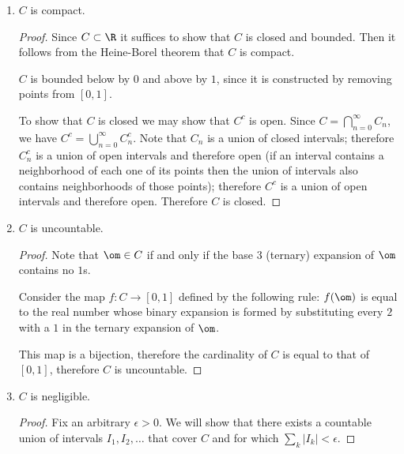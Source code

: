 \begin{enumerate}[label=(2.\arabic*)]
\item
  \begin{claim*}
    $C$ is compact.
  \end{claim*}
  \begin{proof} 
    Since $C \subset \R$ it suffices to show that $C$ is closed and bounded. Then it follows from the Heine-Borel
    theorem that $C$ is compact.

    $C$ is bounded below by $0$ and above by $1$, since it is constructed by removing points from $[0, 1]$.

    To show that $C$ is closed we may show that $C^c$ is open. Since $C = \bigcap_{n=0}^\infty C_n$, we
    have $C^c = \bigcup_{n=0}^\infty C_n^c$. Note that $C_n$ is a union of closed intervals; therefore $C_n^c$
    is a union of open intervals and therefore open (if an interval contains a neighborhood of each one of its
    points then the union of intervals also contains neighborhoods of those points); therefore $C^c$ is a union
    of open intervals and therefore open. Therefore $C$ is closed.
  \end{proof}

\item
  \begin{claim*}
    $C$ is uncountable.
  \end{claim*}

  \begin{proof}
    Note that $\om \in C$ if and only if the base 3 (ternary) expansion of $\om$ contains no $1$s.

    Consider the map $f:C \to [0, 1]$ defined by the following rule: $f(\om)$ is equal to the real number whose
    binary expansion is formed by substituting every $2$ with a $1$ in the ternary expansion of $\om$.

    This map is a bijection, therefore the cardinality of $C$ is equal to that of $[0, 1]$, therefore $C$ is
    uncountable.
  \end{proof}

\item \begin{claim*}
    $C$ is negligible.
  \end{claim*}

  \begin{proof}
    Fix an arbitrary $\epsilon > 0$. We will show that there exists a countable union of
    intervals $I_1, I_2, \ldots$ that cover $C$ and for which $\sum_k |I_k| < \epsilon$.


\end{proof}
\end{enumerate}
